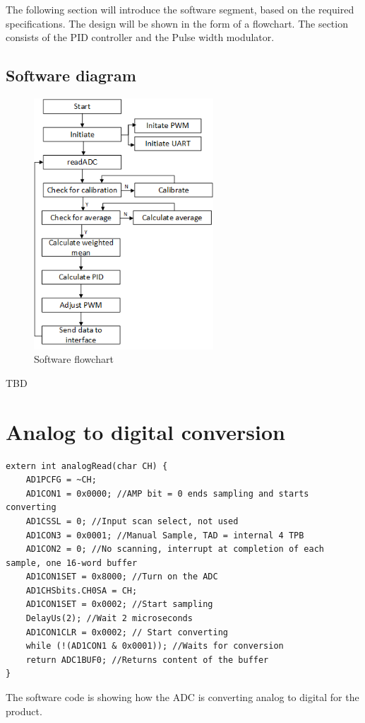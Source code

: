 
The following section will introduce the software segment, based on the required specifications. The design will be shown in the form of a flowchart.
The section consists of the PID controller and the Pulse width modulator.

\subsection{Software diagram}

\begin{figure}[h!]
  \centering
  \includegraphics[width=0.6\textwidth]{figures/softwareflowchart.png}  
\caption{Software flowchart}  
  \label{Softwareflowchart}
\end{figure}
TBD

\newpage
\section{Analog to digital conversion}


\begin{lstlisting}
extern int analogRead(char CH) {
    AD1PCFG = ~CH;
    AD1CON1 = 0x0000; //AMP bit = 0 ends sampling and starts converting
    AD1CSSL = 0; //Input scan select, not used
    AD1CON3 = 0x0001; //Manual Sample, TAD = internal 4 TPB
    AD1CON2 = 0; //No scanning, interrupt at completion of each sample, one 16-word buffer
    AD1CON1SET = 0x8000; //Turn on the ADC
    AD1CHSbits.CH0SA = CH;
    AD1CON1SET = 0x0002; //Start sampling
    DelayUs(2); //Wait 2 microseconds
    AD1CON1CLR = 0x0002; // Start converting
    while (!(AD1CON1 & 0x0001)); //Waits for conversion
    return ADC1BUF0; //Returns content of the buffer	
}
\end{lstlisting}
The software code is showing how the ADC is converting analog to digital for the product.
\newpage

